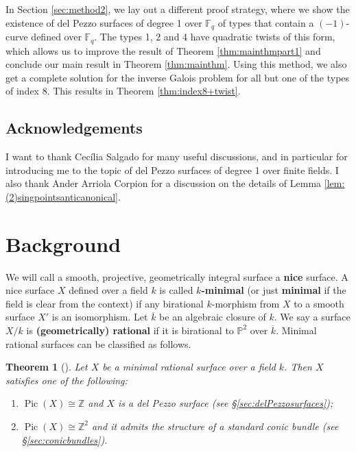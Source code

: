 \documentclass[a4paper, 11pt, reqno]{amsart}
\numberwithin{equation}{section} \numberwithin{figure}{section}
\newcommand{\term}[1]{\textbf{#1}}          %
\DeclareMathOperator{\Pic}{Pic}
\def \F {{\mathbb F}}
\def \P {{\mathbb P}}
\def \Z {{\mathbb Z}}
\newtheorem{theorem}[lemma]{Theorem}
\theoremstyle{definition}
\numberwithin{lemma}{section}
\begin{document}
In Section \ref{sec:method2}, we lay out a different proof strategy, where we show the existence of del Pezzo surfaces of degree 1 over $\F_q$ of types that contain a $(-1)$-curve defined over $\F_q$. The types 1, 2 and 4 have quadratic twists of this form, which allows us to improve the result of Theorem \ref{thm:mainthmpart1} and conclude our main result in Theorem \ref{thm:mainthm}. Using this method, we also get a complete solution for the inverse Galois problem for all but one of the types of index 8. This results in Theorem \ref{thm:index8+twist}.

\subsection*{Acknowledgements}

I want to thank Cec\'{i}lia Salgado for many useful discussions, and in particular for introducing me to the topic of del Pezzo surfaces of degree 1 over finite fields. I also thank Ander Arriola Corpion for a 
discussion on the details of Lemma \ref{lem:(2)singpointsanticanonical}.

\section{Background} \label{sec:background}

We will call a smooth, projective, geometrically integral surface a \term{nice} surface. A nice surface $X$ defined over a field $k$ is called \term{$k$-minimal} (or just \term{minimal} if the field is clear from the context) if any birational $k$-morphism from $X$ to a smooth surface $X'$ is an isomorphism. Let $\overline{k}$ be an algebraic closure of $k$. We say a surface $X/k$ is \term{(geometrically) rational} if it is birational to $\P^2$ over $\overline{k}$. 
Minimal rational surfaces can be classified as follows.

\begin{theorem}[{\cite[Theorem 1]{iskovskih}}]\label{thm:iskovskih1}
    Let $X$ be a minimal rational surface over a field $k$. Then $X$ satisfies one of the following:
    \begin{enumerate}
    \item $\Pic(X) \cong \Z$ and $X$ is a del Pezzo surface (see \S\ref{sec:delPezzosurfaces});
    \item $\Pic(X) \cong \Z^2$ and it admits the structure of a standard conic bundle (see \S\ref{sec:conicbundles}).
\end{enumerate} 
\end{theorem}
\end{document}
